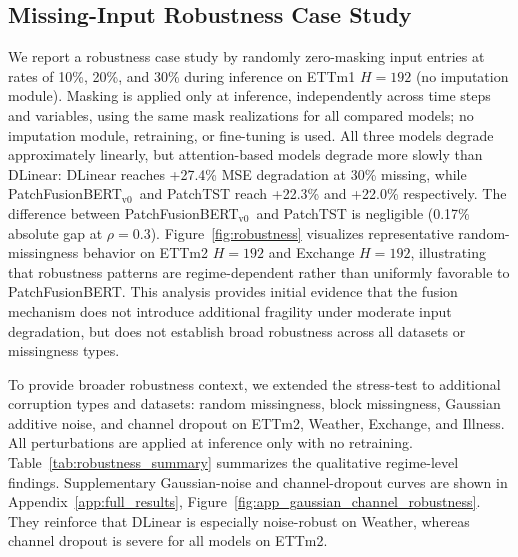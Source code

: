 \documentclass{ieeeaccess}
\newcommand{\model}{PatchFusionBERT\xspace}
\newcommand{\modelvzero}{PatchFusionBERT$_{\text{v0}}$\xspace}
\begin{document}
\subsection{Missing-Input Robustness Case Study}
We report a robustness case study by randomly zero-masking input entries at rates of
10\%, 20\%, and 30\% during inference on ETTm1 $H=192$ (no imputation module).
Masking is applied only at inference, independently across time steps and variables,
using the same mask realizations for all compared models; no imputation module,
retraining, or fine-tuning is used.
All three models degrade approximately linearly, but attention-based models degrade
more slowly than DLinear: DLinear reaches +27.4\% MSE degradation at 30\% missing,
while \modelvzero\ and PatchTST reach +22.3\% and +22.0\% respectively. The
difference between \modelvzero\ and PatchTST is negligible (0.17\% absolute gap at
$\rho=0.3$). Figure~\ref{fig:robustness} visualizes representative
random-missingness behavior on ETTm2 $H=192$ and Exchange $H=192$,
illustrating that robustness patterns are regime-dependent rather than uniformly
favorable to \model. This
analysis provides initial evidence that the fusion mechanism does not introduce
additional fragility under moderate input degradation, but does not establish broad
robustness across all datasets or missingness types.

To provide broader robustness context, we extended the stress-test to additional
corruption types and datasets: random missingness, block missingness, Gaussian
additive noise, and channel dropout on ETTm2, Weather, Exchange, and Illness.
All perturbations are applied at inference only with no retraining. Table~\ref{tab:robustness_summary}
summarizes the qualitative regime-level findings. Supplementary Gaussian-noise and
channel-dropout curves are shown in Appendix~\ref{app:full_results},
Figure~\ref{fig:app_gaussian_channel_robustness}. They reinforce that DLinear is
especially noise-robust on Weather, whereas channel dropout is severe for all
models on ETTm2.
\end{document}
